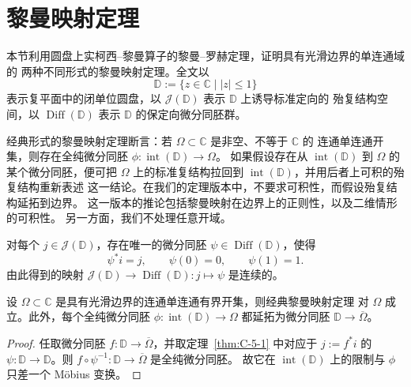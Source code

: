 
\section{黎曼映射定理}\label{sec:C-5}

本节利用圆盘上实柯西--黎曼算子的黎曼--罗赫定理，证明具有光滑边界的单连通域的
两种不同形式的黎曼映射定理。全文以
\[
  \mathbb D:=\{z\in\mathbb C\mid |z|\le1\}
\]
表示复平面中的闭单位圆盘，以 $\mathcal J(\mathbb D)$ 表示 $\mathbb D$ 上诱导标准定向的
殆复结构空间，以 $\operatorname{Diff}(\mathbb D)$ 表示 $\mathbb D$ 的保定向微分同胚群。

经典形式的黎曼映射定理断言：若 $\Omega\subset\mathbb C$ 是非空、不等于 $\mathbb C$ 的
连通单连通开集，则存在全纯微分同胚 $\phi:\operatorname{int}(\mathbb D)\to\Omega$。
如果假设存在从 $\operatorname{int}(\mathbb D)$ 到 $\Omega$ 的某个微分同胚，便可把 $\Omega$
上的标准复结构拉回到 $\operatorname{int}(\mathbb D)$，并用后者上可积的殆复结构重新表述
这一结论。在我们的定理版本中，不要求可积性，而假设殆复结构延拓到边界。
这一版本的推论包括黎曼映射在边界上的正则性，以及二维情形的可积性。
另一方面，我们不处理任意开域。

\begin{theorem}\label{thm:C-5-1}
对每个 $j\in\mathcal J(\mathbb D)$，存在唯一的微分同胚
$\psi\in\operatorname{Diff}(\mathbb D)$，使得
\begin{equation}\label{eq:C-5-1}
  \psi^*i=j,\qquad \psi(0)=0,\qquad \psi(1)=1.
\end{equation}
由此得到的映射 $\mathcal J(\mathbb D)\to\operatorname{Diff}(\mathbb D):j\mapsto\psi$
是连续的。
\end{theorem}

\begin{corollary}\label{cor:C-5-2}
设 $\Omega\subset\mathbb C$ 是具有光滑边界的连通单连通有界开集，则经典黎曼映射定理
对 $\Omega$ 成立。此外，每个全纯微分同胚
$\phi:\operatorname{int}(\mathbb D)\to\Omega$ 都延拓为微分同胚
$\mathbb D\to\overline\Omega$。
\end{corollary}

\begin{proof}
任取微分同胚 $f:\mathbb D\to\overline\Omega$，并取定理~\ref{thm:C-5-1} 中对应于
$j:=f^*i$ 的 $\psi:\mathbb D\to\mathbb D$。则
$f\circ\psi^{-1}:\mathbb D\to\overline\Omega$ 是全纯微分同胚。
故它在 $\operatorname{int}(\mathbb D)$ 上的限制与 $\phi$ 只差一个 Möbius 变换。
\end{proof}

